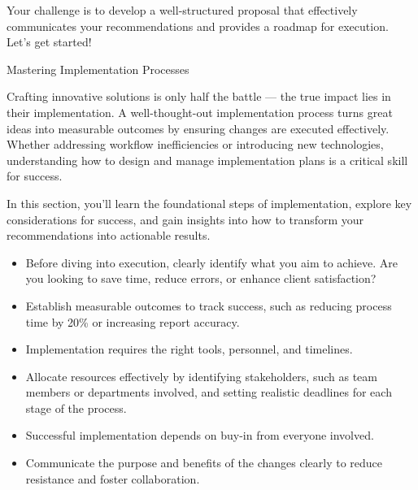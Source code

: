\documentclass[11pt]{article}
\begin{document}

Your challenge is to develop a well-structured proposal that effectively
communicates your recommendations and provides a roadmap for execution. Let's
get started!

\newpage
{\fontsize{26}{30}\selectfont Mastering Implementation Processes}\par\bigskip

Crafting innovative solutions is only half the battle --- the true impact lies
in their implementation. A well-thought-out implementation process turns great
ideas into measurable outcomes by ensuring changes are executed effectively.
Whether addressing workflow inefficiencies or introducing new technologies,
understanding how to design and manage implementation plans is a critical
skill for success.

In this section, you'll learn the foundational steps of implementation,
explore key considerations for success, and gain insights into how to
transform your recommendations into actionable results.


\begin{itemize}[leftmargin=1.5em, itemsep=2pt]
  \item Before diving into execution, clearly identify what you aim to
  achieve. Are you looking to save time, reduce errors, or enhance client
  satisfaction?
  \item Establish measurable outcomes to track success, such as reducing
  process time by 20\% or increasing report accuracy.
\end{itemize}

\begin{itemize}[leftmargin=1.5em, itemsep=2pt]
  \item Implementation requires the right tools, personnel, and timelines.
  \item Allocate resources effectively by identifying stakeholders, such as
  team members or departments involved, and setting realistic deadlines for
  each stage of the process.
\end{itemize}

\begin{itemize}[leftmargin=1.5em, itemsep=2pt]
  \item Successful implementation depends on buy-in from everyone involved.
  \item Communicate the purpose and benefits of the changes clearly to reduce
  resistance and foster collaboration.
\end{itemize}
\end{document}
